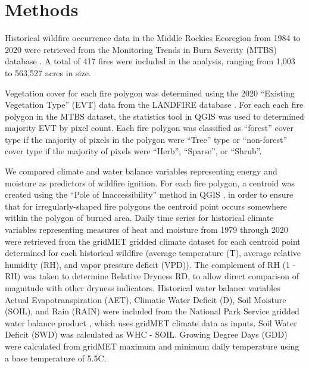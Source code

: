 \documentclass[11pt]{article}
\begin{document}
\section{Methods}

Historical wildfire occurrence data in the Middle Rockies Ecoregion from 1984 to 2020 were retrieved from the Monitoring Trends in Burn Severity (MTBS) database \citep{eidenshinkProjectMonitoringTrends2007}.  A total of 417 fires were included in the analysis, ranging from 1,003 to 563,527 acres in size.  

Vegetation cover for each fire polygon was determined using the 2020 ``Existing Vegetation Type'' (EVT) data from the LANDFIRE database \citep{rollinsLANDFIRENationallyConsistent2009}.  For each each fire polygon in the MTBS dataset, the statistics tool in QGIS was used to determined majority EVT by pixel count.  Each fire polygon was classified as ``forest'' cover type if the majority of pixels in the polygon were ``Tree'' type or ``non-forest'' cover type if the majority of pixels were ``Herb'', ``Sparse'', or ``Shrub''.  


We compared climate and water balance variables representing energy and moisture as predictors of wildfire ignition. For each fire polygon, a centroid was created using the ``Pole of Inaccessibility'' method in QGIS \citep{QGIS_software}, in order to ensure that for irregularly-shaped fire polygons the centroid point occurs somewhere within the polygon of burned area. Daily time series for historical climate variables representing measures of heat and moisture from 1979 through 2020 were retrieved from the gridMET gridded climate dataset \citep{abatzoglouDevelopmentGriddedSurface2013} for each centroid point determined for each historical wildfire (average temperature (T), average relative humidity (RH), and vapor pressure deficit (VPD)).  The complement of RH (1 - RH) was taken to determine Relative Dryness RD, to allow direct comparison of magnitude with other dryness indicators. Historical water balance variables Actual Evapotranspiration (AET), Climatic Water Deficit (D), Soil Moisture (SOIL), and Rain (RAIN) were included from the National Park Service gridded water balance product \citep{tercekHistoricalChangesPlant2021}, which uses gridMET climate data as inputs.  Soil Water Deficit (SWD) was calculated as WHC - SOIL.  Growing Degree Days (GDD) were calculated from gridMET maximum and minimum daily temperature using a base temperature of 5.5\degree C.
\end{document}

